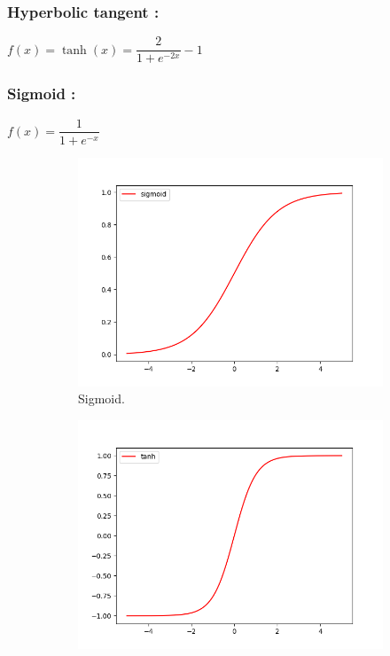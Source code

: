 \documentclass[10pt,a4paper]{article}
\begin{document}
\subsubsection{Hyperbolic tangent :}
\begin{center}
$ f(x) = \tanh(x) = \dfrac{2}{1 + e^{-2x}} - 1 $
\end{center}
\subsubsection{Sigmoid :}
\begin{center}
$ f(x) = \dfrac{1}{1 + e^{-x}} $
\end{center}
\begin{figure}[H]
\centering
\begin{subfigure}[b]{0.3\textwidth}
\includegraphics[scale=0.3]{sigmoid.png}
\caption{Sigmoid.}
\end{subfigure}
\begin{subfigure}[b]{0.3\textwidth}
\includegraphics[scale=0.3]{tanh.png}

\end{subfigure}
\end{figure}
\end{document}
